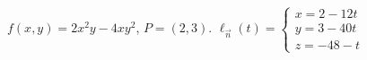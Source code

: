 {$f(x,y) = 2x^2y-4xy^2$,   $P=(2,3)$.\label{12_06_ex_09a}
}
{
	$\ell_{\vec n}(t) = \left\{\begin{array}{l} x=2-12t\\ y=3-40t \\ z = -48-t\end{array}\right.$
}